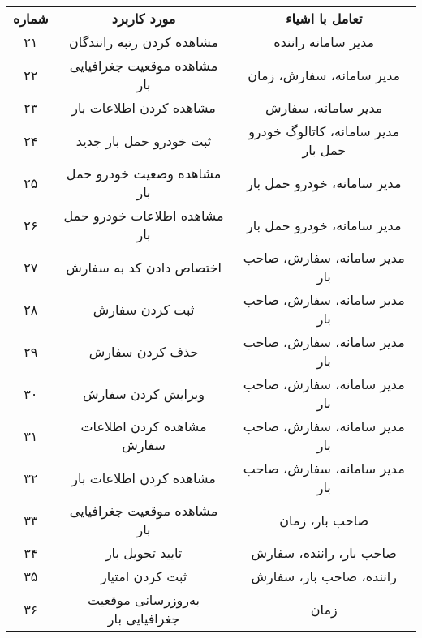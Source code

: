 \begin{table}[!hbtp]
	\centering
	\begin{tabular}{|c|c|c|}
		\cline{1-3}
		\textbf{شماره} & \textbf{مورد کاربرد} & \textbf{تعامل با اشیاء} \\ \cline{1-3}
			۲۱ & مشاهده کردن رتبه رانندگان & مدیر سامانه راننده \\
		۲۲ & مشاهده موقعیت جغرافیایی بار & مدیر سامانه، سفارش، زمان \\
		۲۳ & مشاهده کردن اطلاعات بار & مدیر سامانه، سفارش \\
		۲۴ & ثبت خودرو حمل بار جدید & مدیر سامانه، کاتالوگ خودرو حمل بار \\
		۲۵ & مشاهده وضعیت خودرو حمل بار & مدیر سامانه، خودرو حمل بار \\
		۲۶ & مشاهده اطلاعات خودرو حمل بار & مدیر سامانه، خودرو حمل بار \\
		۲۷ & اختصاص دادن کد به سفارش & مدیر سامانه، سفارش، صاحب بار \\
		۲۸ & ثبت کردن سفارش & مدیر سامانه، سفارش، صاحب بار \\
		۲۹ & حذف کردن سفارش & مدیر سامانه، سفارش، صاحب بار \\
		۳۰ & ویرایش کردن سفارش & مدیر سامانه، سفارش،‌ صاحب بار \\
		۳۱ & مشاهده کردن اطلاعات سفارش & مدیر سامانه، سفارش، صاحب بار \\
		۳۲ & مشاهده کردن اطلاعات بار & مدیر سامانه، سفارش، صاحب بار \\
		۳۳ & مشاهده موقعیت جغرافیایی بار & صاحب بار، زمان \\
		۳۴ & تایید تحویل بار & صاحب بار، راننده، سفارش \\
		۳۵ & ثبت کردن امتیاز & راننده، صاحب بار، سفارش \\
		۳۶ & به‌روزرسانی موقعیت جغرافیایی بار & زمان \\
		\cline{1-3}
	\end{tabular}
\end{table}




